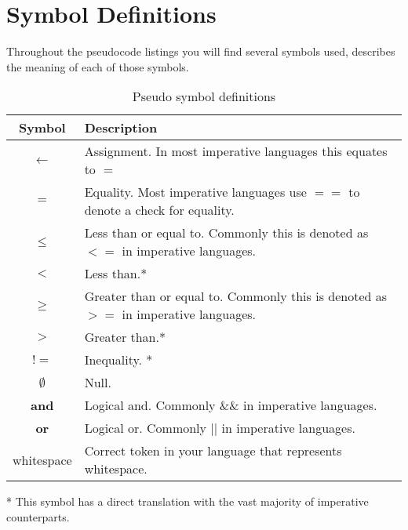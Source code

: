 \chapter{Symbol Definitions}
Throughout the pseudocode listings you will find several symbols used,  describes the meaning of each of those symbols.

\begin{table}
\caption{Pseudo symbol definitions}
\begin{tabular}[t]{|c|l|}
\hline
\textbf{Symbol} & \textbf{Description} \\
\hline
$\leftarrow$ & Assignment. In most imperative languages this equates to $=$ \\
\hline
$=$ & Equality. Most imperative languages use $==$ to denote a check for equality. \\
\hline
$\leq$ & Less than or equal to. Commonly this is denoted as $<=$ in imperative languages. \\
\hline
$<$ & Less than.* \\
\hline
$\geq$ & Greater than or equal to. Commonly this is denoted as $>=$ in imperative languages. \\
\hline
$>$ & Greater than.* \\
\hline
$!=$ & Inequality. * \\
\hline
$\emptyset$ & Null. \\
\hline
\textbf{and} & Logical and. Commonly \&\& in imperative languages. \\
\hline
\textbf{or} & Logical or. Commonly || in imperative languages. \\ 
\hline
whitespace & Correct token in your language that represents whitespace. \\
\hline
\end{tabular}
\end{table}

* This symbol has a direct translation with the vast majority of imperative counterparts.
